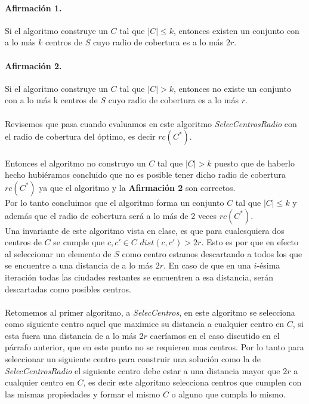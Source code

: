 \documentclass[12pt]{article}
\begin{document}
	\paragraph{Afirmación 1.} Si el algoritmo construye un $C$ tal que $|C| \leq k$, entonces existen un conjunto con a lo más $k$ centros de $S$ cuyo radio de cobertura es a lo más $2r$.
	\paragraph{Afirmación 2.} Si el algoritmo construye un $C$ tal que $|C| > k$, entonces no existe un conjunto con a lo más k centros de $S$ cuyo radio de cobertura es a lo más $r$.
	\paragraph{} Revisemos que pasa cuando evaluamos en este algoritmo \textit{SelecCentrosRadio} con el radio de cobertura del óptimo, es decir $rc(C^*)$.
	\paragraph{} Entonces el algoritmo no construyo un $C$ tal que $|C| > k$ puesto que de haberlo hecho hubiéramos concluido que no es posible tener dicho radio de cobertura $rc(C^*)$ ya que el algoritmo y la \textbf{Afirmación 2} son correctos.
	\\ Por lo tanto concluimos que el algoritmo forma un conjunto $C$ tal que $|C| \leq k$ y además que el radio de cobertura será a lo más de 2 veces $rc(C^*)$.\\
	Una invariante de este algoritmo vista en clase, es que para cualesquiera dos centros de $C$ se cumple que $c,c'\in C$ $dist(c,c') > 2r$. Esto es por que en efecto al seleccionar un elemento de $S$ como centro estamos descartando a todos los que se encuentre a una distancia de a lo más $2r$. En caso de que en una $i$-ésima iteración todas las ciudades restantes se encuentren a esa distancia, serán descartadas como posibles centros.
	\paragraph{} Retomemos al primer algoritmo, a \textit{SelecCentros}, en este algoritmo se selecciona como siguiente centro aquel que maximice su distancia a cualquier centro en $C$, si esta fuera una distancia de a lo más $2r$ caeríamos en el caso discutido en el párrafo anterior, que en este punto no se requieren mas centros. Por lo tanto para seleccionar un siguiente centro para construir una  solución como la de \textit{SelecCentrosRadio} el siguiente centro debe estar a una distancia mayor que $2r$ a cualquier centro en $C$, es decir este algoritmo selecciona centros que cumplen con las mismas propiedades y formar el mismo $C$ o alguno que cumpla lo mismo.
\end{document}
